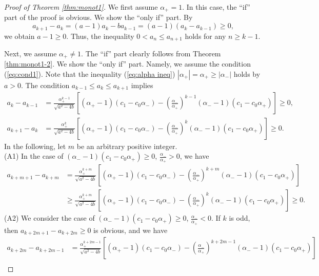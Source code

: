 \documentclass[a4paper,11pt,reqno]{amsart}
\theoremstyle{plain}
\theoremstyle{definition}
\begin{document}
\begin{proof}[Proof of Theorem \ref{thm:monot1}]
We first assume $\alpha _{+}=1$. 
In this case, the ``if'' part of the proof is obvious. 
We show the ``only if'' part. 
By
$$
a_{k+1}-a_{k}
   =
   (a-1)a_{k}-ba_{k-1}
   =
   (a-1)(a_{k}-a_{k-1})\geq 0 ,
$$
we obtain $a-1\geq 0$. 
Thus, the inequality $0<a_{n}\leq a_{n+1}$ holds for any $n\geq k-1$. 

Next, we assume $\alpha _{+}\not=1$. 
The ``if'' part clearly follows from Theorem \ref{thm:monot1-2}. 
We show the ``only if'' part. 
Namely, we assume the condition (\ref{eq:cond1}). 
Note that the inequality (\ref{eq:alpha ineq}) $|\alpha _{+}|=\alpha _{+}\geq |\alpha _{-}|$ holds by
$a>0$. 
The condition $a_{k-1}\leq a_{k}\leq a_{k+1}$ implies 
\begin{align*}
a_{k}-a_{k-1}
   &=
   \frac{\alpha _{+}^{k-1}}{\sqrt{a^{2}-4b}}
   \left[(\alpha _{+}-1)(c_{1}-c_{0}\alpha _{-})-\left(\frac{\alpha _{-}}{\alpha _{+}}\right)^{k-1}(\alpha _{-}-1)(c_{1}-c_{0}\alpha _{+})\right]
   \geq 0
, \\
a_{k+1}-a_{k}
   &=
   \frac{\alpha _{+}^{k}}{\sqrt{a^{2}-4b}}
   \left[(\alpha _{+}-1)(c_{1}-c_{0}\alpha _{-})-\left(\frac{\alpha _{-}}{\alpha _{+}}\right)^{k}(\alpha _{-}-1)(c_{1}-c_{0}\alpha _{+})\right]
   \geq 0 .
\end{align*}
In the following, let $m$ be an arbitrary positive integer. 
\\
(A1) 
In the case of $(\alpha _{-}-1)(c_{1}-c_{0}\alpha _{+})\geq 0$, $\frac{\alpha _{-}}{\alpha _{+}}>0$, 
we have 
\begin{align*}
a_{k+m+1}-a_{k+m}
   &=
   \frac{\alpha _{+}^{k+m}}{\sqrt{a^{2}-4b}}
   \left[(\alpha _{+}-1)(c_{1}-c_{0}\alpha _{-})-\left(\frac{\alpha _{-}}{\alpha _{+}}\right)^{k+m}(\alpha _{-}-1)(c_{1}-c_{0}\alpha _{+})\right] \\
   &\geq
   \frac{\alpha _{+}^{k+m}}{\sqrt{a^{2}-4b}}
   \left[(\alpha _{+}-1)(c_{1}-c_{0}\alpha _{-})-\left(\frac{\alpha _{-}}{\alpha _{+}}\right)^{k}(\alpha _{-}-1)(c_{1}-c_{0}\alpha _{+})\right]
   \geq 0.
\end{align*}
(A2) 
We consider the case of $(\alpha _{-}-1)(c_{1}-c_{0}\alpha _{+})\geq 0$, $\frac{\alpha _{-}}{\alpha _{+}}<0$. 
If $k$ is odd, then $a_{k+2m+1}-a_{k+2m}\geq 0$ is obvious, and we have 
\begin{align*}
a_{k+2m}-a_{k+2m-1}
   &=
   \frac{\alpha _{+}^{k+2m-1}}{\sqrt{a^{2}-4b}}
   \left[(\alpha _{+}-1)(c_{1}-c_{0}\alpha _{-})-\left(\frac{\alpha _{-}}{\alpha _{+}}\right)^{k+2m-1}(\alpha _{-}-1)(c_{1}-c_{0}\alpha _{+})\right] \\

\end{align*}
\end{proof}
\end{document}
